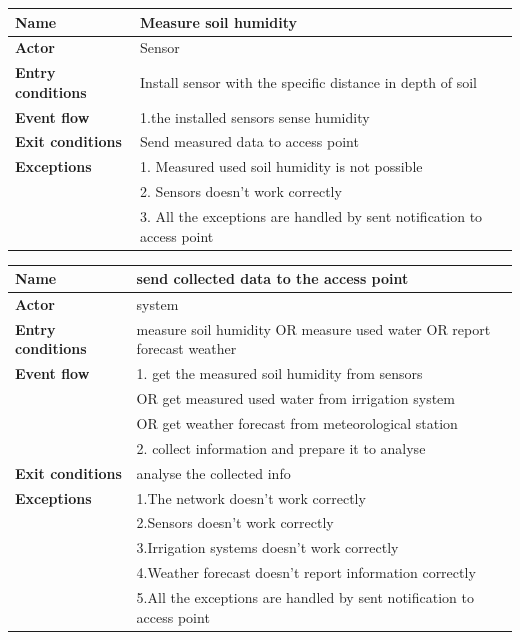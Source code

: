 \begin{table}[H]
\begin{tabular}{|l|l|}
\hline
\normalsize	
\textbf{Name} & Measure soil humidity\\\hline
\textbf{Actor} & Sensor\\\hline
\textbf{Entry conditions} & Install sensor with the specific distance in depth of soil\\\hline
\textbf{Event flow} & 1.the installed sensors sense humidity \\\hline
\textbf{Exit conditions} & Send measured data to access point \\\hline
\textbf{Exceptions}& 
1. Measured used soil humidity is not possible \\&
2. Sensors doesn't work correctly\\&
3. All the exceptions are handled by sent notification to access point 
\\\hline
\end{tabular}
\end{table}



\begin{table}[H]
\begin{tabular}{|l|l|}
\hline
\normalsize	
\textbf{Name} & send collected data to the  access point\\\hline
\textbf{Actor} & system\\\hline
\textbf{Entry conditions} & measure soil humidity  OR  measure used water OR  report forecast weather \\\hline
\textbf{Event flow}  &  1. get the measured soil humidity from sensors\\&
OR get measured used water from irrigation system \\&
OR get weather forecast from meteorological station \\&
2. collect information and prepare it to analyse\\\hline
\textbf{Exit conditions} & analyse the collected info \\\hline
\textbf{Exceptions }& 
1.The network doesn't work correctly  \\&
2.Sensors doesn't work correctly \\&
3.Irrigation systems doesn't work correctly \\&
4.Weather forecast doesn't report information correctly\\&
5.All the exceptions are handled by sent notification to access point
\\\hline
\end{tabular}
\end{table}



